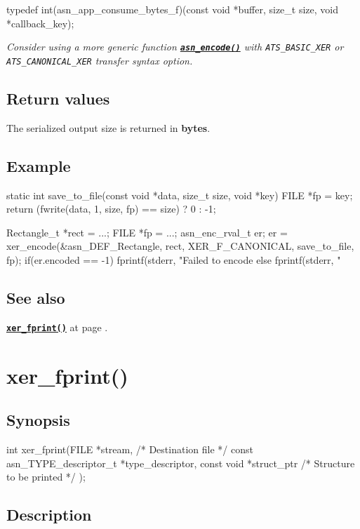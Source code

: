 \documentclass[english,oneside,12pt]{book}
\newcommand{\apisection}[2]{\clearpage\section{\label{#1}#2}}
\newcommand{\api}[2]{\hyperref[#1]{\code{#2}}}
\newcommand{\seealso}[2]{\api{#1}{#2} at page \pageref{#1}}
\newcommand{\code}[1]{\texttt{\textbf{\lstinline{#1}}}}
\begin{document}
\begin{signature}
typedef int(asn_app_consume_bytes_f)(const void *buffer, size_t size, void *callback_key);
\end{signature}

\noindent\emph{Consider using a more generic function \api{sec:asn_encode}{asn_encode()} with \texttt{ATS\_BASIC\_XER} or \texttt{ATS\_CANONICAL\_XER} transfer syntax option.}

\subsection*{Return values}


The serialized output size is returned in \textbf{bytes}.

\subsection*{Example}
\begin{example}
static int
save_to_file(const void *data, size_t size, void *key) {
    FILE *fp = key;
    return (fwrite(data, 1, size, fp) == size) ? 0 : -1;
}

Rectangle_t *rect = ...;
FILE *fp = ...;
asn_enc_rval_t er;
er = xer_encode(&asn_DEF_Rectangle, rect, XER_F_CANONICAL, save_to_file, fp);
if(er.encoded == -1) {
   fprintf(stderr, "Failed to encode %
} else {
   fprintf(stderr, "%
}
\end{example}

\subsection*{See also}
\seealso{sec:xer_fprint}{xer_fprint()}.

\apisection{sec:xer_fprint}{xer\_fprint()}

\subsection*{Synopsis}
\begin{signature}
int xer_fprint(FILE *stream,    /* Destination file */
    const asn_TYPE_descriptor_t *type_descriptor,
    const void *struct_ptr      /* Structure to be printed */
);
\end{signature}

\subsection*{Description}
\end{document}
